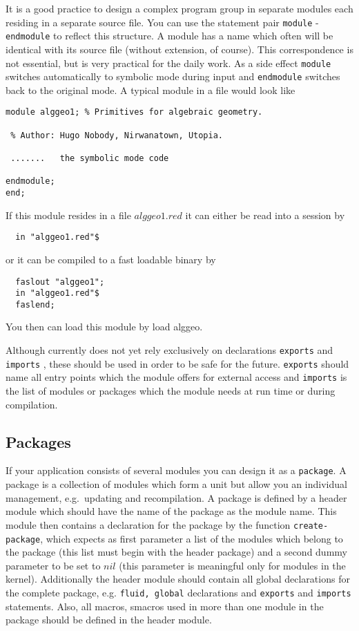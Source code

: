 It is a good practice to design a complex program
group in separate modules each residing in a
separate source file. You can use the {\reduce}
statement pair {\tt module} - 
{\tt endmodule}
to reflect this structure. A module has a name 
which often will be identical with its source file
(without extension, of course). This correspondence
is not essential, but is very practical for the daily
work. As a side effect {\tt module} switches automatically
to symbolic mode during input and {\tt endmodule} switches
back to the original mode. A typical module in a file
would look like

\begin{verbatim}
module alggeo1; % Primitives for algebraic geometry.

 % Author: Hugo Nobody, Nirwanatown, Utopia.

 .......   the symbolic mode code

endmodule;
end;
\end{verbatim}

If this module resides in a file $alggeo1.red$ it can
either be read into a {\reduce} session by
\begin{verbatim}
  in "alggeo1.red"$
\end{verbatim}
or it can be compiled to a fast loadable binary by
\begin{verbatim}
  faslout "alggeo1";
  in "alggeo1.red"$
  faslend;
\end{verbatim}
You then can load this module by {load alggeo}.

Although {\reduce} currently does not yet rely exclusively on
declarations {\tt exports} and {\tt imports}
, these should be used in order to be
safe for the future. {\tt exports} should name all
entry points which the module offers for external access
and {\tt imports} is the list of modules
or packages which the module needs at run time or
during compilation.

\subsection{Packages}

If your application consists of several modules you can
design it as a {\tt package}. A package is a
collection of modules which form a unit but allow you an individual
management, e.g.\  updating and recompilation. A package
is defined by a header module which should have the
name of the package as the module name. This module
then contains a declaration for the package by the
function {\tt create-package}, which expects as
first parameter a list of the modules which belong to the package
(this list must begin with the header package) and
a second dummy parameter to be set to $nil$ (this
parameter is meaningful only for modules in the 
{\reduce} kernel). Additionally the header
module should contain all global declarations
for the complete package, e.g. {\tt fluid, global}
declarations and {\tt exports} and {\tt imports}
statements. 
Also, all macros, smacros used in more than one module
in the package should be defined in the header module.

